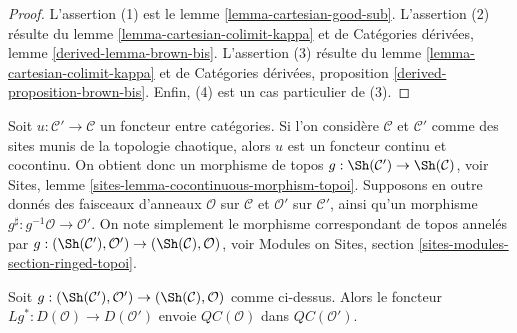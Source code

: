 \begin{proof}
L'assertion (1) est le lemme \ref{lemma-cartesian-good-sub}. L'assertion (2)
résulte du lemme \ref{lemma-cartesian-colimit-kappa} et de Catégories dérivées,
lemme \ref{derived-lemma-brown-bis}. L'assertion (3) résulte du lemme
\ref{lemma-cartesian-colimit-kappa} et de Catégories dérivées, proposition
\ref{derived-proposition-brown-bis}. Enfin, (4) est un cas particulier de
(3).
\end{proof}

\noindent
Soit $u : \mathcal{C}' \to \mathcal{C}$ un foncteur entre catégories. Si
l'on considère $\mathcal{C}$ et $\mathcal{C}'$ comme des sites munis de la
topologie chaotique, alors $u$ est un foncteur continu et cocontinu. On obtient
donc un morphisme de topos
$g : \Sh(\mathcal{C}') \to \Sh(\mathcal{C})$, voir Sites, lemme
\ref{sites-lemma-cocontinuous-morphism-topoi}. Supposons en outre donnés des
faisceaux d'anneaux $\mathcal{O}$ sur $\mathcal{C}$ et $\mathcal{O}'$ sur
$\mathcal{C}'$, ainsi qu'un morphisme
$g^\sharp : g^{-1}\mathcal{O} \to \mathcal{O}'$. On note simplement le
morphisme correspondant de topos annelés par
$g : (\Sh(\mathcal{C}'), \mathcal{O}') \to (\Sh(\mathcal{C}), \mathcal{O})$,
voir Modules on Sites, section \ref{sites-modules-section-ringed-topoi}.

\begin{lemma}
\label{lemma-cartesian-functorial}
Soit
$g : (\Sh(\mathcal{C}'), \mathcal{O}') \to (\Sh(\mathcal{C}), \mathcal{O})$
comme ci-dessus. Alors le foncteur
$Lg^* : D(\mathcal{O}) \to D(\mathcal{O}')$ envoie
$\mathit{QC}(\mathcal{O})$ dans $\mathit{QC}(\mathcal{O}')$.
\end{lemma}

